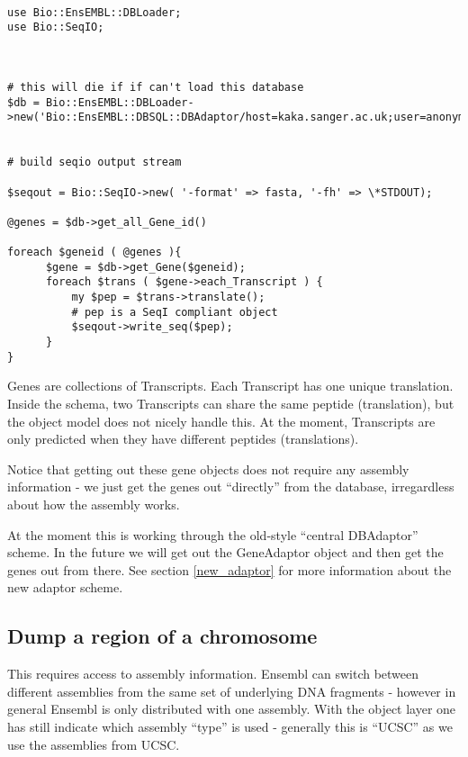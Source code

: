 \documentclass[11pt,a4paper]{article}
\begin{document}
\begin{verbatim}

use Bio::EnsEMBL::DBLoader;
use Bio::SeqIO;



# this will die if if can't load this database
$db = Bio::EnsEMBL::DBLoader->new('Bio::EnsEMBL::DBSQL::DBAdaptor/host=kaka.sanger.ac.uk;user=anonymous;dbname=current');


# build seqio output stream

$seqout = Bio::SeqIO->new( '-format' => fasta, '-fh' => \*STDOUT);

@genes = $db->get_all_Gene_id()

foreach $geneid ( @genes ){
      $gene = $db->get_Gene($geneid);
      foreach $trans ( $gene->each_Transcript ) {
          my $pep = $trans->translate();
          # pep is a SeqI compliant object
          $seqout->write_seq($pep);
      }
}

\end{verbatim}

Genes are collections of Transcripts. Each Transcript has one unique
translation. Inside the schema, two Transcripts can share the same
peptide (translation), but the object model does not nicely handle
this. At the moment, Transcripts are only predicted when they have
different peptides (translations).

Notice that getting out these gene objects does not require any
assembly information - we just get the genes out ``directly'' from the
database, irregardless about how the assembly works.

At the moment this is working through the old-style ``central
DBAdaptor'' scheme. In the future we will get out the GeneAdaptor
object and then get the genes out from there. See section \ref{new_adaptor}
for more information about the new adaptor scheme.


\subsection{Dump a region of a chromosome}

This requires access to assembly information. Ensembl can switch
between different assemblies from the same set of underlying DNA
fragments - however in general Ensembl is only distributed with
one assembly. With the object layer one has still indicate which
assembly ``type'' is used - generally this is ``UCSC'' as we use
the assemblies from UCSC.
\end{document}
